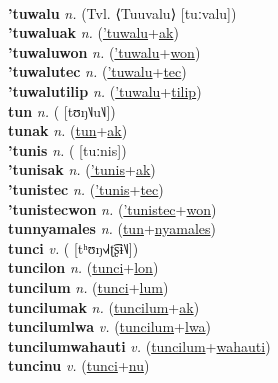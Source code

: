  \label{tulsepic} \\
\textbf{'tuwalu} \textit{n.} (Tvl. ⟨Tuuvalu⟩ [tuːvalu])
 \label{'tuwalu} \\
\textbf{'tuwaluak} \textit{n.} (\hyperref['tuwalu]{'tuwalu}+\hyperref[ak]{ak})
 \label{'tuwaluak} \\
\textbf{'tuwaluwon} \textit{n.} (\hyperref['tuwalu]{'tuwalu}+\hyperref[won]{won})
 \label{'tuwaluwon} \\
\textbf{'tuwalutec} \textit{n.} (\hyperref['tuwalu]{'tuwalu}+\hyperref[tec]{tec})
 \label{'tuwalutec} \\
\textbf{'tuwalutilip} \textit{n.} (\hyperref['tuwalu]{'tuwalu}+\hyperref[tilip]{tilip})
 \label{'tuwalutilip} \\
\textbf{tun} \textit{n.} ( [tʊŋ˥˩u˥˩])
 \label{tun} \\
\textbf{tunak} \textit{n.} (\hyperref[tun]{tun}+\hyperref[ak]{ak})
 \label{tunak} \\
\textbf{'tunis} \textit{n.} ( [tuːnis])
 \label{'tunis} \\
\textbf{'tunisak} \textit{n.} (\hyperref['tunis]{'tunis}+\hyperref[ak]{ak})
 \label{'tunisak} \\
\textbf{'tunistec} \textit{n.} (\hyperref['tunis]{'tunis}+\hyperref[tec]{tec})
 \label{'tunistec} \\
\textbf{'tunistecwon} \textit{n.} (\hyperref['tunistec]{'tunistec}+\hyperref[won]{won})
 \label{'tunistecwon} \\
\textbf{tunnyamales} \textit{n.} (\hyperref[tun]{tun}+\hyperref[nyamales]{nyamales})
 \label{tunnyamales} \\
\textbf{tunci} \textit{v.} ( [tʰʊŋ˧˩˧ʈ͡ʂɨ˥˩])
 \label{tunci} \\
\textbf{tuncilon} \textit{n.} (\hyperref[tunci]{tunci}+\hyperref[lon]{lon})
 \label{tuncilon} \\
\textbf{tuncilum} \textit{n.} (\hyperref[tunci]{tunci}+\hyperref[lum]{lum})
 \label{tuncilum} \\
\textbf{tuncilumak} \textit{n.} (\hyperref[tuncilum]{tuncilum}+\hyperref[ak]{ak})
 \label{tuncilumak} \\
\textbf{tuncilumlwa} \textit{v.} (\hyperref[tuncilum]{tuncilum}+\hyperref[lwa]{lwa})
 \label{tuncilumlwa} \\
\textbf{tuncilumwahauti} \textit{v.} (\hyperref[tuncilum]{tuncilum}+\hyperref[wahauti]{wahauti})
 \label{tuncilumwahauti} \\
\textbf{tuncinu} \textit{v.} (\hyperref[tunci]{tunci}+\hyperref[nu]{nu})
